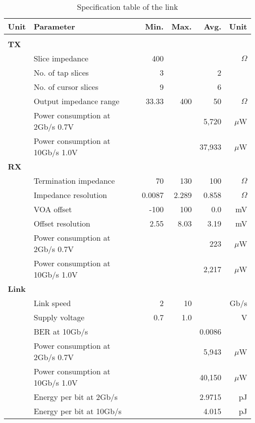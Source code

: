 \begin{table}[H]
  \centering
  \begin{tabular}{l l|r|r|r|r}
 Unit  & Parameter & Min. & Max. & Avg. & Unit \\
    \hline
    & & & & &\\
\textbf{TX} & & & & &\\
&	Slice impedance & 400 &  &  & $\Omega$\\
&	No. of tap slices & 3 &  & 2 & \\
&	No. of cursor slices & 9 &  & 6 & \\
&	Output impedance range & 33.33 & 400 & 50 & $\Omega$\\
&	Power consumption at 2Gb/s 0.7V &  &  & 5,720 & $\mu$W\\
&	Power consumption at 10Gb/s 1.0V &  &  & 37,933 & $\mu$W\\

\textbf{RX} & & & & &\\
&	Termination impedance & 70 & 130 & 100 & $\Omega$\\
&	Impedance resolution & 0.0087 & 2.289 & 0.858 & $\Omega$\\
&	VOA offset & -100 & 100 & 0.0 & mV\\
&	Offset resolution & 2.55 & 8.03 & 3.19 & mV\\
&	Power consumption at 2Gb/s 0.7V &  &  & 223  & $\mu$W\\
&	Power consumption at 10Gb/s 1.0V &&  &  2,217  & $\mu$W\\

\textbf{Link} & & & & &\\
&	Link speed & 2 & 10 &  & Gb/s \\
&	Supply voltage  & 0.7 & 1.0 &  & V\\
&	BER at 10Gb/s  &  &  & 0.0086 & \\
&	Power consumption at 2Gb/s 0.7V &  &  & 5,943 & $\mu$W\\
&	Power consumption at 10Gb/s 1.0V &  &  & 40,150 & $\mu$W\\
&   Energy per bit at 2Gb/s &  & & 2.9715 & pJ \\
&   Energy per bit at 10Gb/s &  & & 4.015 & pJ \\
  \end{tabular}
  \caption{Specification table of the link}
  \label{tab:final_specifications}
\end{table}